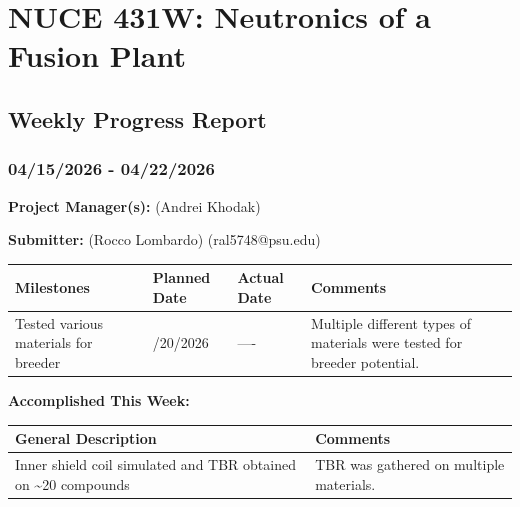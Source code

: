 \documentclass{article}
\begin{document}
{\centering \section*{NUCE 431W: Neutronics of a Fusion Plant}

\subsection*{Weekly Progress Report}

\subsubsection*{04/15/2026 - 04/22/2026}}


\hrulefill

\bigskip

\textbf{Project Manager(s):} (Andrei Khodak) 

\bigskip

\textbf{Submitter:} (Rocco Lombardo) (ral5748@psu.edu)

\bigskip

\renewcommand{\arraystretch}{1.5}
\begin{table}[H]
    \centering
    \begin{tabularx}{0.95\textwidth} { 
        | >{\centering\arraybackslash}X 
        | >{\centering\arraybackslash}X 
        | >{\centering\arraybackslash}X
        | >{\centering\arraybackslash}X | }

    \hline
    \textbf{Milestones} & \textbf{Planned Date} & \textbf{Actual Date} & \textbf{Comments} \\
    \hline
    Tested various materials for breeder  & 04/20/2026  & ---- & Multiple different types of materials were tested for breeder potential.    \\
    \hline
    \end{tabularx}
\end{table}

\bigskip

\textbf{Accomplished This Week: }

\renewcommand{\arraystretch}{1.5}
\begin{table}[H]
    \centering
    \begin{tabularx}{0.95\textwidth} { 
        | >{\centering\arraybackslash}X
        | >{\centering\arraybackslash}X | }

    \hline
    \textbf{General Description} & \textbf{Comments} \\
    \hline
    Inner shield coil simulated and TBR obtained on \sim 20 compounds  & TBR was gathered on multiple materials. \\
    \hline
    \end{tabularx}
\end{table}
\end{document}

